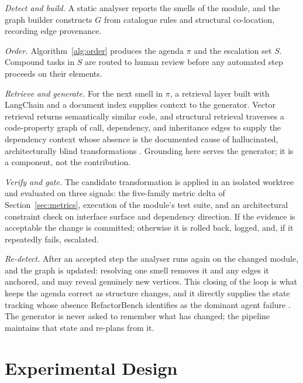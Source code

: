 \documentclass[journal,onecolumn,11pt]{IEEEtran}
\begin{document}
\emph{Detect and build.} A static analyser reports the smells of the module, and the graph builder constructs $G$ from catalogue rules and structural co-location, recording edge provenance.

\emph{Order.} Algorithm~\ref{alg:order} produces the agenda $\pi$ and the escalation set $S$. Compound tasks in $S$ are routed to human review before any automated step proceeds on their elements.

\emph{Retrieve and generate.} For the next smell in $\pi$, a retrieval layer built with LangChain and a document index supplies context to the generator. Vector retrieval returns semantically similar code, and structural retrieval traverses a code-property graph of call, dependency, and inheritance edges to supply the dependency context whose absence is the documented cause of hallucinated, architecturally blind transformations \cite{gautam2025}. Grounding here serves the generator; it is a component, not the contribution.

\emph{Verify and gate.} The candidate transformation is applied in an isolated worktree and evaluated on three signals: the five-family metric delta of Section~\ref{sec:metrics}, execution of the module's test suite, and an architectural constraint check on interface surface and dependency direction. If the evidence is acceptable the change is committed; otherwise it is rolled back, logged, and, if it repeatedly fails, escalated.

\emph{Re-detect.} After an accepted step the analyser runs again on the changed module, and the graph is updated: resolving one smell removes it and any edges it anchored, and may reveal genuinely new vertices. This closing of the loop is what keeps the agenda correct as structure changes, and it directly supplies the state tracking whose absence RefactorBench identifies as the dominant agent failure \cite{gautam2025}. The generator is never asked to remember what has changed; the pipeline maintains that state and re-plans from it.

\section{Experimental Design}
\label{sec:experiment}
\end{document}
